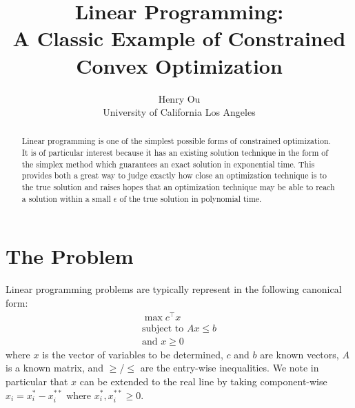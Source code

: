 \documentclass[letterpaper,twocolumn,12pt]{article}
\begin{document}

\date{}

\title{\Large \bf Linear Programming:\\
  A Classic Example of Constrained Convex Optimization}

\author{
{\rm Henry Ou}\\
University of California Los Angeles
} %

\maketitle

\begin{abstract}
Linear programming is one of the simplest possible forms of constrained optimization.
It is of particular interest because it has an existing solution technique in the form
of the simplex method which guarantees an exact solution in exponential time. This
provides both a great way to judge exactly how close an optimization technique is to
the true solution and raises hopes that an optimization technique may be able to reach
a solution within a small $\epsilon$ of the true solution in polynomial time.
\end{abstract}


\section{The Problem}

Linear programming problems are typically represent in the following canonical form:
\begin{align*}
    \max c^\intercal x\\
    \text{subject to } Ax\leq b\\
    \text{and } x\geq 0
\end{align*}
where $x$ is the vector of variables to be determined, $c$ and $b$ are known vectors,
$A$ is a known matrix, and $\geq$/$\leq$ are the entry-wise inequalities. We note in
particular that $x$ can be extended to the real line by taking component-wise
$x_i=x_i^*-x_i^{**}$ where $x_i^*,x_i^{**}\geq 0$.
\end{document}
